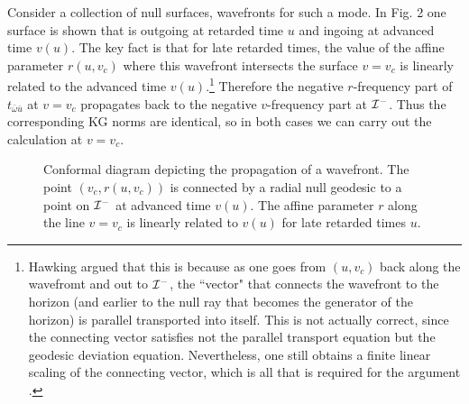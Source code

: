 \documentclass[12pt]{article}
\def\obar{\bar{\omega}}
\def\ubar{\bar{u}}
\def\pastI{{\cal I}^-}
\begin{document}
Consider a collection of null surfaces, wavefronts for such a mode.
In Fig. 2 one surface is shown that is outgoing at
retarded time $u$ and ingoing at advanced time $v(u)$. The
key fact is that for late retarded times,
the value of the affine parameter $r(u,v_c)$ where this
wavefront intersects the surface $v=v_c$ is linearly
related to the advanced time $v(u)$.\footnote{Hawking
argued that this is because as one goes from $(u,v_c)$ back
along the wavefromt and out to $\pastI$, the ``vector" that
connects the wavefront to the horizon (and earlier to the null
ray that becomes the generator of the horizon) is parallel
transported into itself. This is not actually correct, since
the connecting vector satisfies not the parallel transport
equation but the geodesic deviation equation. Nevertheless,
one still obtains a finite linear scaling of the connecting vector,
which is all that is required for the argument \cite{WaldGR}.}
Therefore the negative
$r$-frequency part of $t_{\obar\ubar}$ at $v=v_c$ propagates
back to the negative $v$-frequency part at $\pastI$. Thus
the corresponding KG norms are identical, so in both cases
we can carry out the calculation at $v=v_c$.

\begin{figure}[ht]
\caption{Conformal diagram depicting the propagation of a wavefront.
The point $(v_c, r(u,v_c))$ is connected by a radial null geodesic
to a point on $\pastI$ at advanced time $v(u)$. The affine parameter
$r$ along the line $v=v_c$ is linearly related to $v(u)$ for late
retarded times $u$.}
\end{figure}
\end{document}
